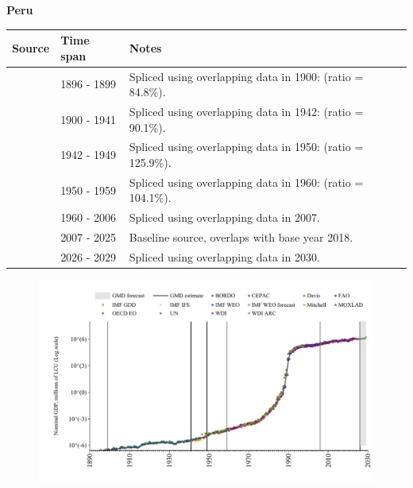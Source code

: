 \documentclass[12pt,a4paper,landscape]{article}
\begin{document}
\begin{adjustbox}{max totalsize={\paperwidth}{\paperheight},center}
\begin{minipage}[t][\textheight][t]{\textwidth}
\vspace*{0.5cm}
{}
\begin{center}
{\Large\bfseries Peru}
\end{center}
\vspace{0.5cm}
\begin{table}[H]
\centering
\small
\begin{tabular}{|l|l|l|}
\hline
\textbf{Source} & \textbf{Time span} & \textbf{Notes} \\
\hline
\rowcolor{white}\cite{Davis}& 1896 - 1899 &Spliced using overlapping data in 1900: (ratio = 84.8\%).\\
\rowcolor{lightgray}\cite{MOXLAD}& 1900 - 1941 &Spliced using overlapping data in 1942: (ratio = 90.1\%).\\
\rowcolor{white}\cite{Mitchell}& 1942 - 1949 &Spliced using overlapping data in 1950: (ratio = 125.9\%).\\
\rowcolor{lightgray}\cite{IMF_GDD}& 1950 - 1959 &Spliced using overlapping data in 1960: (ratio = 104.1\%).\\
\rowcolor{white}\cite{WDI}& 1960 - 2006 &Spliced using overlapping data in 2007.\\
\rowcolor{lightgray}\cite{OECD_EO}& 2007 - 2025 &Baseline source, overlaps with base year 2018.\\
\rowcolor{white}\cite{IMF_WEO_forecast}& 2026 - 2029 &Spliced using overlapping data in 2030.\\
\hline
\end{tabular}
\end{table}
\begin{figure}[H]
\centering
\includegraphics[width=\textwidth,height=0.6\textheight,keepaspectratio]{graphs/PER_nGDP.pdf}
\end{figure}
\end{minipage}
\end{adjustbox}
\end{document}
